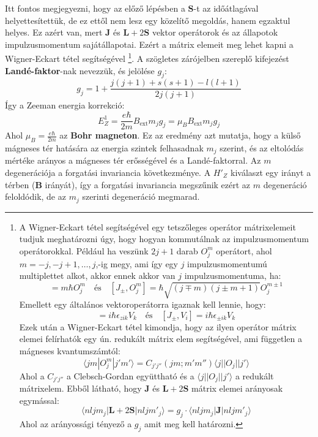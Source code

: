 \documentclass[../main.tex]{subfiles}
\begin{document}
Itt fontos megjegyezni, hogy az előző lépésben a $\mathbf{S}$-t az időátlagával helyettesítettük, de ez ettől nem lesz egy közelítő megoldás, hanem egzaktul helyes. Ez azért van, mert
$\mathbf{J}$ és $\mathbf{L} + 2\mathbf{S}$ vektor operátorok és az állapotok impulzusmomentum sajátállapotai. Ezért a mátrix elemeit meg lehet kapni a Wigner-Eckart tétel segítségével
\footnote{
    A Wigner-Eckart tétel segítségével egy tetszőleges operátor mátrixelemeit tudjuk meghatározni úgy, hogy hogyan kommutálnak az impulzusmomentum operátorokkal.
    Például ha veszünk $2j+1$ darab $O^m_j$ operátort, ahol $m=-j, -j+1, \ldots, j$,-ig megy, ami így egy $j$ impulzusmomentumú multiplettet alkot, akkor ennek akkor van $j$ impulzusmomentuma, ha:
    \begin{equation}
        [J_z, O^m_j] = m \hbar O^m_j \quad \text{és} \quad [J_\pm, O^m_j] = \hbar \sqrt{(j \mp m)(j \pm m + 1)} O^{m \pm 1}_j
    \end{equation}
    Emellett egy általános vektoroperátorra igaznak kell lennie, hogy:
    \begin{equation}
        [J_z, V_i] = i \hbar \epsilon_{z i k} V_k \quad \text{és} \quad [J_\pm, V_i] = i \hbar \epsilon_{\pm i k} V_k
    \end{equation}
    Ezek után a Wigner-Eckart tétel kimondja, hogy az ilyen operátor mátrix elemei felírhatók egy ún. redukált mátrix elem segítségével, ami független a mágneses kvantumszámtól:
    \begin{equation}
        \langle j m | O^{m}_j | j' m' \rangle = C_{j' j''} ( j m; m' m'' )\langle j || O_j || j' \rangle
    \end{equation}
    Ahol a $C_{j' j''}$ a Clebsch-Gordan együttható és a $\langle j || O_j || j' \rangle$ a redukált mátrixelem. Ebből látható, hogy $\mathbf{J}$ és $\mathbf{L} + 2\mathbf{S}$ mátrix elemei arányosak egymással:
    \begin{equation}
        \langle n l j m_j | \mathbf{L} + 2 \mathbf{S} | n l j m'_j \rangle = g_j \cdot \langle n l j m_j | \mathbf{J} | n l j m'_j \rangle
    \end{equation}
    Ahol az arányossági tényező a $g_j$ amit meg kell határozni.
}.
A szögletes zárójelben szereplő kifejezést \textbf{Landé-faktor}-nak nevezzük, és jelölése $g_j$:
\begin{equation}
    g_j = 1 + \frac{j(j+1) + s(s+1) - l(l+1)}{2 j (j+1)}
\end{equation}
Így a Zeeman energia korrekció:
\begin{equation}
    E^1_{Z} = \frac{e \hbar}{2m} B_{\text{ext}} m_j g_j = \mu_B B_{\text{ext}} m_j g_j
\end{equation}
Ahol $\mu_B = \frac{e \hbar}{2m}$ az \textbf{Bohr magneton}. Ez az eredmény azt mutatja, hogy a külső mágneses tér hatására az energia szintek felhasadnak $m_j$ szerint, és az eltolódás mértéke arányos
a mágneses tér erősségével és a Landé-faktorral. Az $m$ degenerációja a forgatási invariancia következménye. A $H'_Z$ kiválaszt egy irányt a térben ($\mathbf{B}$ irányát), így a forgatási invariancia megszűnik ezért az $m$ degeneráció feloldódik, de az $m_j$ szerinti degeneráció megmarad.
\end{document}
